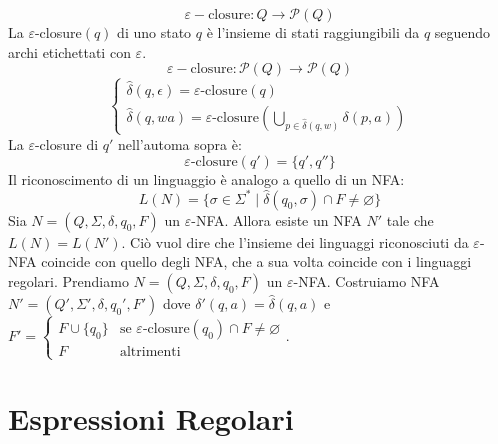 \documentclass[a4paper]{article}
\begin{document}
\[\varepsilon-\text{closure}: Q \rightarrow \mathcal{P}(Q)\]
La $\varepsilon$-closure$(q)$ di uno stato $q$ è l'insieme di stati raggiungibili da $q$
seguendo archi etichettati con $\varepsilon$.
\[\varepsilon-\text{closure}: \mathcal{P}(Q) \rightarrow \mathcal{P}(Q)\]
\[
  \begin{cases}
    \hat{\delta} (q, \epsilon) = \varepsilon\text{-closure}(q)\\
    \hat{\delta} (q, w a) = \varepsilon\text{-closure}\left(\bigcup_{p \in \hat{\delta}(q,w)} \delta(p, a)\right)
  \end{cases}
\]
\ex{}
{
  La $\varepsilon$-closure di $q'$ nell'automa sopra è:
  \[
  \varepsilon\text{-closure}(q') = \{q', q''\}
  \]
}
Il riconoscimento di  un linguaggio è analogo a quello di un NFA:
\[L(N) = \{\sigma \in \Sigma^* \; | \; \hat{\delta}(q_0, \sigma) \cap F \neq \varnothing\}\]
\thm{}
{
  Sia $N = (Q, \Sigma, \delta, q_0, F)$ un $\varepsilon$-NFA.
  Allora esiste un NFA $N'$ tale che $L(N) = L(N')$.
}
\noindent
Ciò vuol dire che l'insieme dei linguaggi riconosciuti da $\varepsilon$-NFA 
coincide con quello degli NFA, che a sua volta coincide con i linguaggi regolari.
Prendiamo $N = (Q, \Sigma, \delta, q_0, F)$ un $\varepsilon$-NFA.
Costruiamo NFA $N' = (Q', \Sigma', \delta, q_0', F')$ dove $\delta'(q,a) = \hat{\delta}(q,a)$
e $F' = \begin{cases}
  F \cup \{q_0\} & \text{se } \varepsilon\text{-closure}(q_0) \cap  F \neq \varnothing\\
  F & \text{altrimenti}
\end{cases}$.

\section{Espressioni Regolari}
\end{document}
